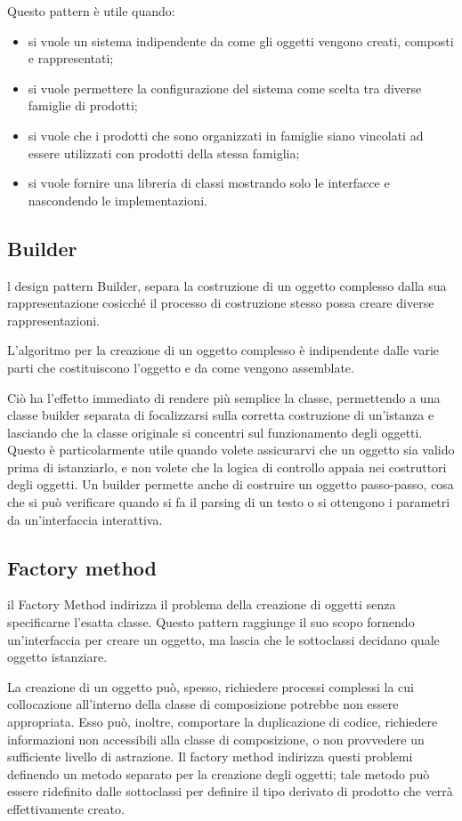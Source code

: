 Questo pattern è utile quando:
\begin{itemize}
	\item si vuole un sistema indipendente da come gli oggetti vengono creati, composti e rappresentati;
	\item si vuole permettere la configurazione del sistema come scelta tra diverse famiglie di prodotti;
	\item si vuole che i prodotti che sono organizzati in famiglie siano vincolati ad essere utilizzati con prodotti della stessa famiglia;
	\item si vuole fornire una libreria di classi mostrando solo le interfacce e nascondendo le implementazioni.
\end{itemize}
\subsection{Builder}
l design pattern Builder, separa la costruzione di un oggetto complesso dalla sua rappresentazione cosicché il processo di costruzione stesso possa creare diverse rappresentazioni.

L'algoritmo per la creazione di un oggetto complesso è indipendente dalle varie parti che costituiscono l'oggetto e da come vengono assemblate.

Ciò ha l'effetto immediato di rendere più semplice la classe, permettendo a una classe builder separata di focalizzarsi sulla corretta costruzione di un'istanza e lasciando che la classe originale si concentri sul funzionamento degli oggetti. Questo è particolarmente utile quando volete assicurarvi che un oggetto sia valido prima di istanziarlo, e non volete che la logica di controllo appaia nei costruttori degli oggetti. Un builder permette anche di costruire un oggetto passo-passo, cosa che si può verificare quando si fa il parsing di un testo o si ottengono i parametri da un'interfaccia interattiva.
\subsection{Factory method}
il Factory Method indirizza il problema della creazione di oggetti senza specificarne l'esatta classe. Questo pattern raggiunge il suo scopo fornendo un'interfaccia per creare un oggetto, ma lascia che le sottoclassi decidano quale oggetto istanziare.

La creazione di un oggetto può, spesso, richiedere processi complessi la cui collocazione all'interno della classe di composizione potrebbe non essere appropriata. Esso può, inoltre, comportare la duplicazione di codice, richiedere informazioni non accessibili alla classe di composizione, o non provvedere un sufficiente livello di astrazione. Il factory method indirizza questi problemi definendo un metodo separato per la creazione degli oggetti; tale metodo può essere ridefinito dalle sottoclassi per definire il tipo derivato di prodotto che verrà effettivamente creato.

